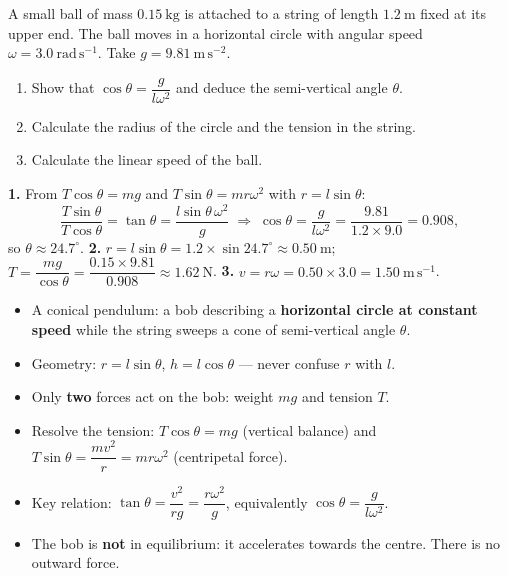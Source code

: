 \documentclass[11pt]{article}
\begin{document}
\begin{exercice}[Practice]
A small ball of mass $0.15\ \mathrm{kg}$ is attached to a string of length $1.2\ \mathrm{m}$ fixed at its upper end. The ball moves in a horizontal circle with angular speed $\omega = 3.0\ \mathrm{rad\,s^{-1}}$. Take $g = 9.81\ \mathrm{m\,s^{-2}}$.
\begin{enumerate}
\item Show that $\cos\theta = \dfrac{g}{l\omega^{2}}$ and deduce the semi-vertical angle $\theta$.
\item Calculate the radius of the circle and the tension in the string.
\item Calculate the linear speed of the ball.
\end{enumerate}
\end{exercice}

\begin{corrige}[Exercise 1]
\textbf{1.} From $T\cos\theta=mg$ and $T\sin\theta = mr\omega^{2}$ with $r=l\sin\theta$:
\[ \frac{T\sin\theta}{T\cos\theta}=\tan\theta=\frac{l\sin\theta\,\omega^{2}}{g}\;\Longrightarrow\;\cos\theta=\frac{g}{l\omega^{2}}=\frac{9.81}{1.2\times 9.0}=0.908, \]
so $\theta \approx 24.7^{\circ}$.
\textbf{2.} $r=l\sin\theta = 1.2\times\sin 24.7^{\circ}\approx 0.50\ \mathrm{m}$; \; $T=\dfrac{mg}{\cos\theta}=\dfrac{0.15\times 9.81}{0.908}\approx 1.62\ \mathrm{N}$.
\textbf{3.} $v=r\omega = 0.50\times 3.0 = 1.50\ \mathrm{m\,s^{-1}}$.
\end{corrige}

\begin{aretenir}
\begin{itemize}
\item A conical pendulum: a bob describing a \textbf{horizontal circle at constant speed} while the string sweeps a cone of semi-vertical angle $\theta$.
\item Geometry: $r=l\sin\theta$, $h=l\cos\theta$ — never confuse $r$ with $l$.
\item Only \textbf{two} forces act on the bob: weight $mg$ and tension $T$.
\item Resolve the tension: $T\cos\theta=mg$ (vertical balance) and $T\sin\theta=\dfrac{mv^{2}}{r}=mr\omega^{2}$ (centripetal force).
\item Key relation: $\tan\theta=\dfrac{v^{2}}{rg}=\dfrac{r\omega^{2}}{g}$, equivalently $\cos\theta=\dfrac{g}{l\omega^{2}}$.
\item The bob is \textbf{not} in equilibrium: it accelerates towards the centre. There is no outward force.
\end{itemize}
\end{aretenir}
\end{document}
